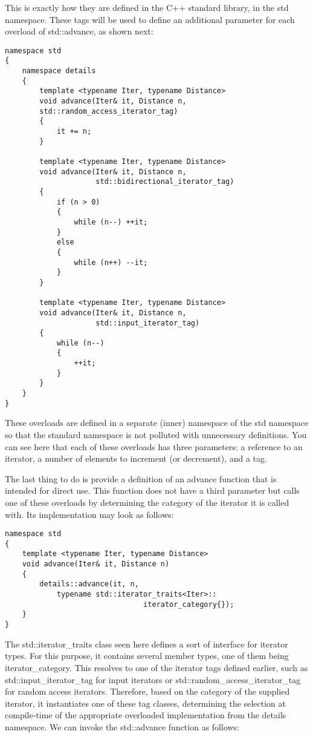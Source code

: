 This is exactly how they are defined in the C++ standard library, in the std namespace. These tags will be used to define an additional parameter for each overload of std::advance, as shown next:

\begin{lstlisting}[style=styleCXX]
namespace std
{
	namespace details
	{
		template <typename Iter, typename Distance>
		void advance(Iter& it, Distance n,
		std::random_access_iterator_tag)
		{
			it += n;
		}
	
		template <typename Iter, typename Distance>
		void advance(Iter& it, Distance n,
					 std::bidirectional_iterator_tag)
		{
			if (n > 0)
			{
				while (n--) ++it;
			}
			else
			{
				while (n++) --it;
			}
		}

		template <typename Iter, typename Distance>
		void advance(Iter& it, Distance n,
				     std::input_iterator_tag)
		{
			while (n--)
			{
				++it;
			}
		}
	}
}
\end{lstlisting}

These overloads are defined in a separate (inner) namespace of the std namespace so that the standard namespace is not polluted with unnecessary definitions. You can see here that each of these overloads has three parameters: a reference to an iterator, a number of elements to increment (or decrement), and a tag.

The last thing to do is provide a definition of an advance function that is intended for direct use. This function does not have a third parameter but calls one of these overloads by determining the category of the iterator it is called with. Its implementation may look as follows:

\begin{lstlisting}[style=styleCXX]
namespace std
{
	template <typename Iter, typename Distance>
	void advance(Iter& it, Distance n)
	{
		details::advance(it, n,
			typename std::iterator_traits<Iter>::
								iterator_category{});
	}
}
\end{lstlisting}

The std::iterator\_traits class seen here defines a sort of interface for iterator types. For this purpose, it contains several member types, one of them being iterator\_category. This resolves to one of the iterator tags defined earlier, such as std::input\_iterator\_tag for input iterators or std::random\_access\_iterator\_tag for random access iterators. Therefore, based on the category of the supplied iterator, it instantiates one of these tag classes, determining the selection at compile-time of the appropriate overloaded implementation from the details namespace. We can invoke the std::advance function as follows:

